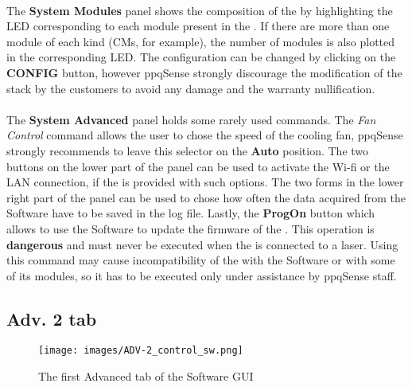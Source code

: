 \paragraph{} The \textbf{System Modules} panel shows the composition of the \QubeModel  by highlighting the LED corresponding to each module present in the \QubeModel . If there are more than one module of each kind (CMs, for example), the number of modules is also plotted in the corresponding LED.
\newline The configuration can be changed by clicking on the \textbf{CONFIG} button, however ppqSense strongly discourage the modification of the \QubeModel  stack by the customers to avoid any damage and the warranty nullification.

\paragraph{} The \textbf{System Advanced} panel holds some rarely used commands. The \textit{Fan Control} command allows the user to chose the speed of the cooling fan, ppqSense strongly recommends to leave this selector on the \textbf{Auto} position.
\newline The two buttons on the lower part of the panel can be used to activate the Wi-fi or the LAN connection, if the \QubeModel  is provided with such options.
\newline The two forms in the lower right part of the panel can be used to chose how often the data acquired from the \SoftwareType Software have to be saved in the log file.
\newline Lastly, the \textbf{ProgOn} button which allows to use the \SoftwareType Software to update the firmware of the \QubeModel . This operation is \textbf{dangerous} and must never be executed when the \QubeModel  is connected to a laser. Using this command may cause incompatibility of the \QubeModel  with the \SoftwareType Software or with some of its modules, so it has to be executed only under assistance by ppqSense staff.




\iffalse
\subsection{Adv. 2 tab}

\begin{figure}[h]
    \centering
    \texttt{[image: images/ADV-2\_control\_sw.png]}
    \caption{The first Advanced tab of the \SoftwareType Software GUI}
    \label{ADV2_SW_interface}
\end{figure}


